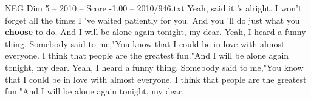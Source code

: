 \begin{textsample}{NEG Dim 5 – 2010 – Score -1.00 – 2010/946.txt}  \label{ex:f5_neg_002}
Yeah, said it 's alright.
I won't forget all the times I 've waited patiently for you.
And you 'll do just what you \textbf{choose} to do.
And I will be alone again tonight, my dear.
Yeah, I heard a funny thing.
Somebody said to me,"You know that I could be in love with almost everyone.
I think that people are the greatest fun."And I will be alone again tonight, my dear.
Yeah, I heard a funny thing.
Somebody said to me,"You know that I could be in love with almost everyone.
I think that people are the greatest fun."And I will be alone again tonight, my dear.

\end{textsample}
